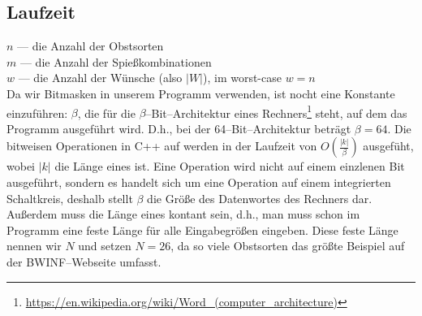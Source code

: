 \subsection{Laufzeit}\label{sec:laufzeit}
$n$ --- die Anzahl der Obstsorten\\
$m$ --- die Anzahl der Spießkombinationen\\
$w$ --- die Anzahl der Wünsche (also $|W|$), im worst-case $w = n$\\

Da wir Bitmasken in unserem Programm verwenden, ist nocht eine Konstante einzuführen: $\beta$,
die für die $\beta$--Bit--Architektur eines Rechners\footnote{\href{https://en.wikipedia.org/wiki/Word_(computer_architecture)}{https://en.wikipedia.org/wiki/Word\_(computer\_architecture)}}
steht, auf dem das Programm ausgeführt wird. D.h., bei der 64--Bit--Architektur beträgt $\beta = 64$.
Die bitweisen Operationen in C++ auf  werden in der Laufzeit von $O(\frac{|k|}{\beta})$
ausgefüht, wobei $|k|$ die Länge eines  ist. Eine Operation wird nicht auf einem einzlenen Bit ausgeführt, sondern es handelt sich um eine Operation auf einem integrierten Schaltkreis, deshalb
stellt $\beta$ die Größe des Datenwortes des Rechners dar.
Außerdem muss die Länge eines 
kontant sein, d.h., man muss schon im Programm eine feste Länge für alle Eingabegrößen eingeben.
Diese feste Länge nennen wir $N$ und setzen $N =26$, da so viele Obstsorten das größte Beispiel
auf der BWINF--Webseite umfasst.

